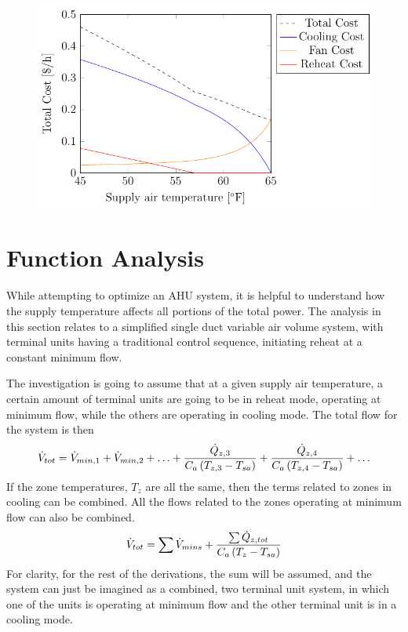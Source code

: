 \begin{figure}
\centering
\includegraphics{Plots/36-SimplifiedExampleCostLowerMAT/simplifiedExampleCostLowMAT.pdf}
\caption{}
\label{fig:simplifiedExampleCostLowerMAT}
\end{figure}


\section{Function Analysis}

While attempting to optimize an AHU system, it is helpful to understand
how the supply temperature affects all portions of the total power. The
analysis in this section relates to a simplified single duct variable
air volume system, with terminal units having a traditional control
sequence, initiating reheat at a constant minimum flow. 

The investigation is going to assume that at a given supply air
temperature, a certain amount of terminal units are going to be in
reheat mode, operating at minimum flow, while the others are operating
in cooling mode. The total flow for the system is then 
%
\begin{equation}
    \dot{V}_{tot} = \dot{V}_{min,1} + \dot{V}_{min,2} + \ldots +
    \frac{\dot{Q}_{z,3}}{C_{a} \left(T_{z,3} - T_{sa}{}\right) } +
    \frac{\dot{Q}_{z,4}}{C_{a} \left(T_{z,4} - T_{sa}{}\right) } +
    \ldots
\end{equation}
%
If the zone temperatures, \(T_{z}\) are all the same, then the terms
related to zones in cooling can be combined. All the flows related to
the zones operating at minimum flow can also be combined.
\begin{equation}
    \dot{V}_{tot} = \sum \dot{V}_{mins} + \frac{\sum \dot{Q}_{z,tot}}{C_{a}
    \left(T_{z} - T_{sa}{}\right) } 
\end{equation}
%
For clarity, for the rest of the derivations, the sum will be assumed,
and the system can just be imagined as a combined, two terminal unit
system, in which one of the units is operating at minimum flow and the
other terminal unit is in a cooling mode. 

